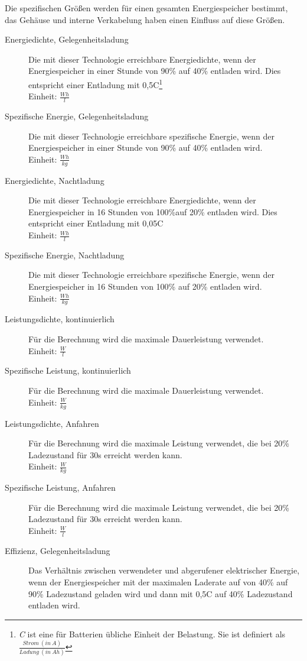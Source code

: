 Die spezifischen Größen werden für einen gesamten Energiespeicher bestimmt, das Gehäuse und interne Verkabelung haben einen Einfluss auf diese Größen. 
\begin{description}
	\item[Energiedichte, Gelegenheitsladung] Die mit dieser Technologie erreichbare Energiedichte, wenn der Energiespeicher in einer Stunde von 90\% auf 40\% entladen wird. Dies entspricht einer Entladung mit 0,5C\footnote{\emph{C} ist eine für Batterien übliche Einheit der Belastung. Sie ist definiert als $\frac{Strom\ (in\ A)}{Ladung\ (in\ Ah)}$}\\
	Einheit: $\frac{Wh}{l}$ 
	\item[Spezifische Energie, Gelegenheitsladung] Die mit dieser Technologie erreichbare spezifische Energie, wenn der Energiespeicher in einer Stunde von 90\% auf 40\% entladen wird.\\
	Einheit: $\frac{Wh}{kg}$
	\item[Energiedichte, Nachtladung] Die mit dieser Technologie erreichbare Energiedichte, wenn der Energiespeicher in 16 Stunden von 100\%auf 20\% entladen wird. Dies entspricht einer Entladung mit 0,05C\\
	Einheit: $\frac{Wh}{l}$
	\item[Spezifische Energie, Nachtladung] Die mit dieser Technologie erreichbare spezifische Energie, wenn der Energiespeicher in 16 Stunden von 100\% auf 20\% entladen wird.\\
	Einheit: $\frac{Wh}{kg}$
	\item[Leistungsdichte, kontinuierlich] Für die Berechnung wird die maximale Dauerleistung verwendet.\\
	Einheit: $\frac{W}{l}$
	\item[Spezifische Leistung, kontinuierlich] Für die Berechnung wird die maximale Dauerleistung verwendet.\\
	Einheit: $\frac{W}{kg}$
	\item[Leistungsdichte, Anfahren] Für die Berechnung wird die maximale Leistung verwendet, die bei 20\% Ladezustand für 30s erreicht werden kann.\\
	Einheit: $\frac{W}{kg}$
	\item[Spezifische Leistung, Anfahren] Für die Berechnung wird die maximale Leistung verwendet, die bei 20\% Ladezustand für 30s erreicht werden kann.\\
	Einheit: $\frac{W}{l}$
	\item[Effizienz, Gelegenheitsladung] Das Verhältnis zwischen verwendeter und abgerufener elektrischer Energie, wenn der Energiespeicher mit der maximalen Laderate auf von 40\% auf 90\% Ladezustand geladen wird und dann mit 0,5C auf 40\% Ladezustand entladen wird.\\

\end{description}

